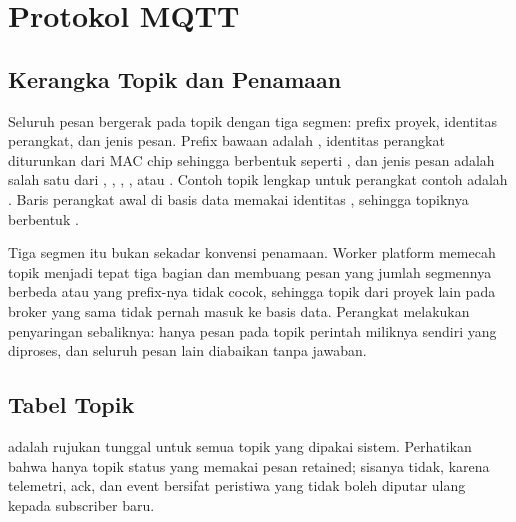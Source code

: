 \chapter{Protokol MQTT}
\label{ch:06-protokol-mqtt}

\section{Kerangka Topik dan Penamaan}

Seluruh pesan bergerak pada topik dengan tiga segmen: prefix proyek, identitas
perangkat, dan jenis pesan. Prefix bawaan adalah \code{\TopicPrefix}, identitas
perangkat diturunkan dari MAC chip sehingga berbentuk
 seperti \code{\DeviceExample}, dan
jenis pesan adalah salah satu dari , , ,
, atau . Contoh topik lengkap untuk perangkat contoh
adalah . Baris perangkat awal di basis data memakai identitas
\code{\SeedDevice}, sehingga topiknya berbentuk .

Tiga segmen itu bukan sekadar konvensi penamaan. Worker platform memecah topik
menjadi tepat tiga bagian dan membuang pesan yang jumlah segmennya berbeda atau
yang prefix-nya tidak cocok, sehingga topik dari proyek lain pada broker yang sama
tidak pernah masuk ke basis data. Perangkat melakukan penyaringan sebaliknya:
hanya pesan pada topik perintah miliknya sendiri yang diproses, dan seluruh pesan
lain diabaikan tanpa jawaban.

\section{Tabel Topik}

 adalah rujukan tunggal untuk semua topik yang dipakai
sistem. Perhatikan bahwa hanya topik status yang memakai pesan retained; sisanya
tidak, karena telemetri, ack, dan event bersifat peristiwa yang tidak boleh
diputar ulang kepada subscriber baru.

